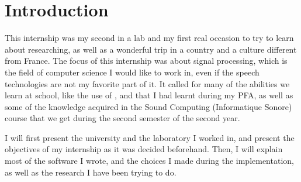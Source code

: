 \chapter*{Introduction}
This internship was my second in a lab and my first real occasion to try to learn about researching, as well as a wonderful trip in a country and a culture different from France.
The focus of this internship was about signal processing, which is the field of computer science I would like to work in, even if the speech technologies are not my favorite part of it. It called for many of the abilities we learn at school, like the use of ,  and  that I had learnt during my \ac{PFA}, as well as some of the knowledge acquired in the Sound Computing (Informatique Sonore) course that we get during the second semester of the second year.

I will first present the university and the laboratory I worked in, and present the objectives of my internship as it was decided beforehand. Then, I will explain most of the software I wrote, and the choices I made during the implementation, as well as the research I have been trying to do.